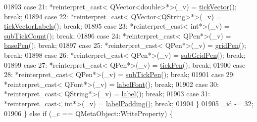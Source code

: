 \begin{DoxyCode}
01893         \textcolor{keywordflow}{case} 21: *\textcolor{keyword}{reinterpret\_cast<} QVector<double>*\textcolor{keyword}{>}(\_v) = \hyperlink{a00025_a5b00b14f480f926df976cc6c52309e78}{tickVector}(); \textcolor{keywordflow}{break};
01894         \textcolor{keywordflow}{case} 22: *\textcolor{keyword}{reinterpret\_cast<} QVector<QString>*\textcolor{keyword}{>}(\_v) = \hyperlink{a00025_a64e6fa81f943ad33dcaf3fa606687b93}{tickVectorLabels}(); \textcolor{keywordflow}{break};
01895         \textcolor{keywordflow}{case} 23: *\textcolor{keyword}{reinterpret\_cast<} \textcolor{keywordtype}{int}*\textcolor{keyword}{>}(\_v) = \hyperlink{a00025_a290b4c1375476826daa10e914cb71dab}{subTickCount}(); \textcolor{keywordflow}{break};
01896         \textcolor{keywordflow}{case} 24: *\textcolor{keyword}{reinterpret\_cast<} QPen*\textcolor{keyword}{>}(\_v) = \hyperlink{a00025_a4f6a7cd46fb104b1dad93e29cc78fe74}{basePen}(); \textcolor{keywordflow}{break};
01897         \textcolor{keywordflow}{case} 25: *\textcolor{keyword}{reinterpret\_cast<} QPen*\textcolor{keyword}{>}(\_v) = \hyperlink{a00025_a7b46670b4beca5337303de119d7ab6d1}{gridPen}(); \textcolor{keywordflow}{break};
01898         \textcolor{keywordflow}{case} 26: *\textcolor{keyword}{reinterpret\_cast<} QPen*\textcolor{keyword}{>}(\_v) = \hyperlink{a00025_a17549b0d7b0c67079f93b33768d3ae2d}{subGridPen}(); \textcolor{keywordflow}{break};
01899         \textcolor{keywordflow}{case} 27: *\textcolor{keyword}{reinterpret\_cast<} QPen*\textcolor{keyword}{>}(\_v) = \hyperlink{a00025_a5eb206da4265c6c083db71d692da3bc4}{tickPen}(); \textcolor{keywordflow}{break};
01900         \textcolor{keywordflow}{case} 28: *\textcolor{keyword}{reinterpret\_cast<} QPen*\textcolor{keyword}{>}(\_v) = \hyperlink{a00025_a2e8bce6dd03e393dbdf6bb427461a726}{subTickPen}(); \textcolor{keywordflow}{break};
01901         \textcolor{keywordflow}{case} 29: *\textcolor{keyword}{reinterpret\_cast<} QFont*\textcolor{keyword}{>}(\_v) = \hyperlink{a00025_ae8029ae0b32e9d4d73dddcdd0a08c838}{labelFont}(); \textcolor{keywordflow}{break};
01902         \textcolor{keywordflow}{case} 30: *\textcolor{keyword}{reinterpret\_cast<} QString*\textcolor{keyword}{>}(\_v) = \hyperlink{a00025_ab3486dca5a6e9e3ca0e32678272ba549}{label}(); \textcolor{keywordflow}{break};
01903         \textcolor{keywordflow}{case} 31: *\textcolor{keyword}{reinterpret\_cast<} \textcolor{keywordtype}{int}*\textcolor{keyword}{>}(\_v) = \hyperlink{a00025_a59c9a0e362dec811491fc9a0709d2afa}{labelPadding}(); \textcolor{keywordflow}{break};
01904         \}
01905         \_id -= 32;
01906     \} \textcolor{keywordflow}{else} \textcolor{keywordflow}{if} (\_c == QMetaObject::WriteProperty) \{

\end{DoxyCode}

